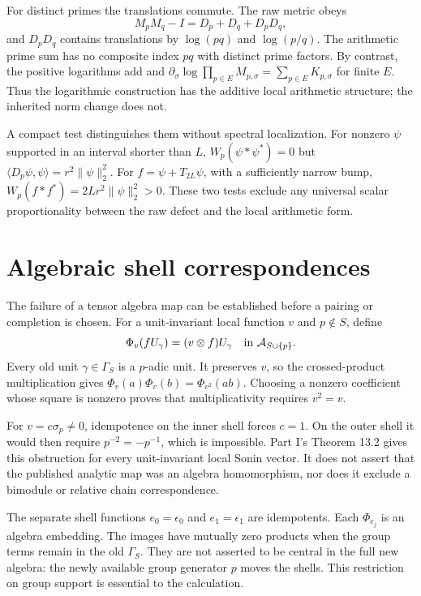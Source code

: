 \documentclass[11pt,letterpaper]{article}
\theoremstyle{definition}
\theoremstyle{remark}
\newcommand{\Acal}{\mathcal A}
\begin{document}
For distinct primes the translations commute. The raw metric obeys
\begin{equation}
 M_pM_q-I=D_p+D_q+D_pD_q,
 \label{eq:metric-mixed}
\end{equation}
and $D_pD_q$ contains translations by $\log(pq)$ and $\log(p/q)$.
The arithmetic prime sum has no composite index $pq$ with distinct
prime factors. By contrast, the positive logarithms add and
$\partial_\sigma\log\prod_{p\in E}M_{p,\sigma}=\sum_{p\in E}K_{p,\sigma}$
for finite $E$. Thus the logarithmic construction has the additive
local arithmetic structure; the inherited norm change does not.

A compact test distinguishes them without spectral localization.
For nonzero $\psi$ supported in an interval shorter than $L$,
$W_p(\psi*\psi^*)=0$ but
$\langle D_p\psi,\psi\rangle=r^2\|\psi\|_2^2$.
For $f=\psi+T_{2L}\psi$, with a sufficiently narrow bump,
$W_p(f*f^*)=2Lr^2\|\psi\|_2^2>0$. These two tests exclude any
universal scalar proportionality between the raw defect and the
local arithmetic form.

\section{Algebraic shell correspondences}

The failure of a tensor algebra map can be established before a
pairing or completion is chosen. For a unit-invariant local
function $v$ and $p\notin S$, define
\begin{equation}
 \Phi_v(fU_\gamma)=(v\otimes f)U_\gamma
        \quad\hbox{in }\Acal_{S\cup\{p\}}.
 \label{eq:Phi}
\end{equation}
Every old unit $\gamma\in\Gamma_S$ is a $p$-adic unit. It preserves
$v$, so the crossed-product multiplication gives
$\Phi_v(a)\Phi_v(b)=\Phi_{v^2}(ab)$. Choosing a nonzero coefficient
whose square is nonzero proves that multiplicativity requires
$v^2=v$.

For $v=c\sigma_p\ne0$, idempotence on the inner shell forces
$c=1$. On the outer shell it would then require
$p^{-2}=-p^{-1}$, which is impossible. Part I's
Theorem 13.2 gives this obstruction for every unit-invariant local
Sonin vector. It does not assert that the published analytic map was
an algebra homomorphism, nor does it exclude a bimodule or relative
chain correspondence.

The separate shell functions $e_0=\epsilon_0$ and $e_1=\epsilon_1$
are idempotents. Each $\Phi_{e_j}$ is an algebra embedding. The images
have mutually zero products when the group terms remain in the old
$\Gamma_S$. They are not asserted to be central in the full new
algebra: the newly available group generator $p$ moves the shells.
This restriction on group support is essential to the calculation.
\end{document}
